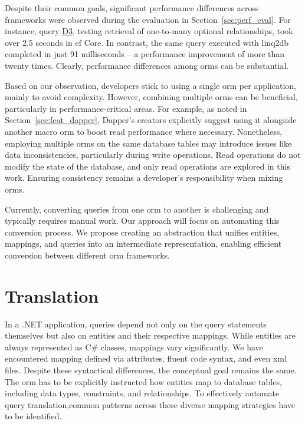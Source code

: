 Despite their common goals, significant performance differences across frameworks were observed during the evaluation in Section~\ref{sec:perf_eval}. For instance, query \hyperref[query:d3]{D3}, testing retrieval of one-to-many optional relationships, took over 2.5 seconds in \acrshort{ef} Core. In contrast, the same query executed with linq2db completed in just 91 milliseconds -- a performance improvement of more than twenty times. Clearly, performance differences among \acrshort{orm}s can be substantial.

Based on our observation, developers stick to using a single \acrshort{orm} per application, mainly to avoid complexity. However, combining multiple \acrshort{orm}s can be beneficial, particularly in performance-critical areas. For example, as noted in Section~\ref{sec:feat_dapper}, Dapper's creators explicitly suggest using it alongside another macro \acrshort{orm} to boost read performance where necessary. Nonetheless, employing multiple \acrshort{orm}s on the same database tables may introduce issues like data inconsistencies, particularly during write operations. Read operations do not modify the state of the database, and only read operations are explored in this work. Ensuring consistency remains a developer's responsibility when mixing \acrshort{orm}s.

Currently, converting queries from one \acrshort{orm} to another is challenging and typically requires manual work. Our approach will focus on automating this conversion process. We propose creating an abstraction that unifies entities, mappings, and queries into an intermediate representation, enabling efficient conversion between different \acrshort{orm} frameworks.

\section{Translation}\label{sec:core_translation}

In a .NET application, queries depend not only on the query statements themselves but also on entities and their respective mappings. While entities are always represented as C\# classes, mappings vary significantly. We have encountered mapping defined via attributes, fluent code syntax, and even \acrshort{xml} files. Despite these syntactical differences, the conceptual goal remains the same. The \acrshort{orm} has to be explicitly instructed how entities map to database tables, including data types, constraints, and relationships. To effectively automate query translation,common patterns across these diverse mapping strategies have to be identified.

